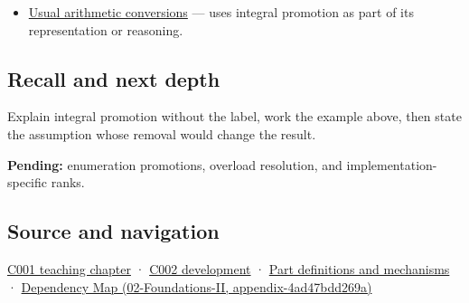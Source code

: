 \begin{itemize}
\tightlist
\item
  \hyperref[appendix-5e2d663adf7f]{Usual arithmetic conversions} --- uses integral promotion as part of its representation or reasoning.
\end{itemize}

\subsection{Recall and next depth}\label{appendix-45303d03796a-recall-and-next-depth}

Explain integral promotion without the label, work the example above, then state the assumption whose removal would change the result.

\textbf{Pending:} enumeration promotions, overload resolution, and implementation-specific ranks.

\subsection{Source and navigation}\label{appendix-45303d03796a-source-and-navigation}

\hyperref[01-foundations-i-ch001-from-a-signal-to-an-interpretation]{C001 teaching chapter} · \hyperref[01-foundations-i-ch001-arithmetic-becomes-a-policy]{C002 development} · \hyperref[appendix-fd090d982a15]{Part definitions and mechanisms} · \href{../02-Foundations-II/main.pdf\#nameddest=appendix-4ad47bdd269a}{Dependency Map (02-Foundations-II, appendix-4ad47bdd269a)}
